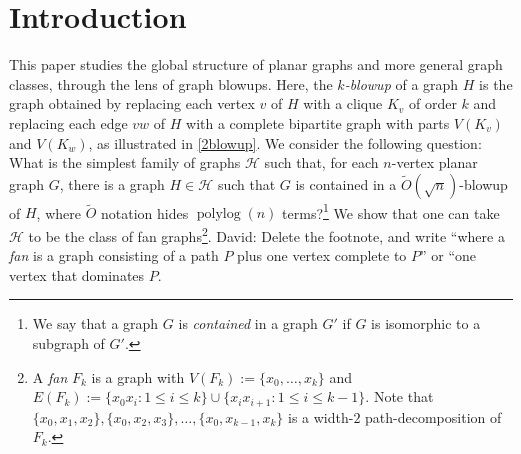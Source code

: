 \documentclass{patmorin}
\renewcommand{\leq}{\leqslant}
\newcommand{\david}[1]{{\color{orange} David: #1}}
\newcommand{\pat}[1]{\textcolor{Blue}{Pat: #1}}
\newcommand{\defin}[1]{\emph{\textcolor{brightmaroon}{#1}}}
\DeclareMathOperator{\polylog}{polylog}
\begin{document}
\newpage
\tableofcontents


\newpage
\section{Introduction}

%


This paper studies the global structure of planar graphs and more general graph classes, through the lens of graph blowups. Here, the \defin{$k$-blowup} of a graph $H$ is the graph obtained by replacing each vertex $v$ of $H$ with a clique $K_v$ of order $k$ and replacing each edge $vw$ of $H$ with a complete bipartite graph with parts $V(K_v)$ and $V(K_w)$, as illustrated in \cref{2blowup}. We consider the following question: What is the simplest family of graphs $\mathcal{H}$ such that, for each $n$-vertex planar graph $G$, there is a graph $H\in\mathcal{H}$ such that $G$ is contained in a $\tilde{O}(\sqrt{n})$-blowup of $H$, where $\tilde{O}$ notation hides $\polylog(n)$ terms?\footnote{We say that a graph $G$ is \defin{contained} in a graph $G'$ if $G$ is isomorphic to a subgraph of $G'$.} We show that one can  take $\mathcal{H}$ to be the class of fan graphs\footnote{A \defin{fan} $F_k$ is a graph with $V(F_k):=\{x_0,\ldots,x_k\}$ and $E(F_k):=\{x_0x_i:1\leq i\leq k\}\cup\{x_ix_{i+1}:1\leq i\leq k-1\}$. Note that $\{x_0,x_1,x_2\},\{x_0,x_2,x_3\},\dots,\{x_0,x_{k-1},x_k\}$ is a width-$2$ path-decomposition of $F_k$.}.
\david{Delete the footnote, and write ``where a \defin{fan} is a graph consisting of a path $P$ plus one vertex complete to $P$'' or ``one vertex that dominates $P$.}
\end{document}
